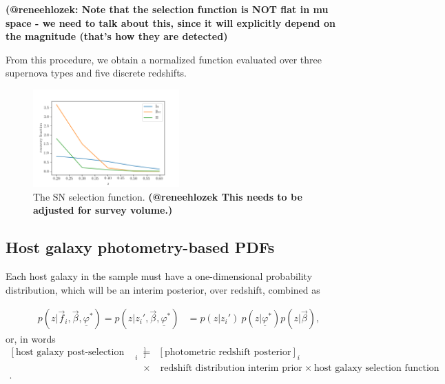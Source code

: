 \documentclass[12pt, twocolumn]{emulateapj}
\newcommand{\textul}{\underline}
\begin{document}
\textbf{(@reneehlozek: Note that the selection function is NOT flat in mu space - we need to talk about this, since it will explicitly depend on the magnitude (that's how they are detected)} 

From this procedure, we obtain a normalized function evaluated over three supernova types and five discrete redshifts.

\begin{figure}
	\begin{center}
		\includegraphics[width=0.5\textwidth]{fig/lc_sel_func.png}
		\caption{The SN selection function.  \textbf{(@reneehlozek This needs to be adjusted for survey volume.)}}
		\label{fig:SNselfun}
	\end{center}
\end{figure}

\subsection{Host galaxy photometry-based PDFs}
\label{sec:hostpdf}

Each host galaxy in the sample must have a one-dimensional probability distribution, which will be an interim posterior, over redshift, combined as
\begin{widetext}
\begin{align}
    \label{eq:fullhostpdf}
    p(z | \vec{f}_{i}, \vec{\beta}, \textul{\varphi}^{*}) = p(z | z_{i}', \vec{\beta}, \textul{\varphi}^{*}) &= p(z | z_{i}')\ p(z | \textul{\varphi}^{*}) p(z | \vec{\beta}),
\end{align}
or, in words
\begin{eqnarray}
    \label{eq:fullhostpdfwords}
    [\textrm{host galaxy post-selection interim posterior}]_{i} &=&[\textrm{photometric redshift posterior}]_{i}\nonumber \\ &\times&\ \textrm{redshift distribution interim prior}\ \times\ \textrm{host galaxy selection function} \nonumber \\.
\end{eqnarray}
\end{widetext}
\end{document}
